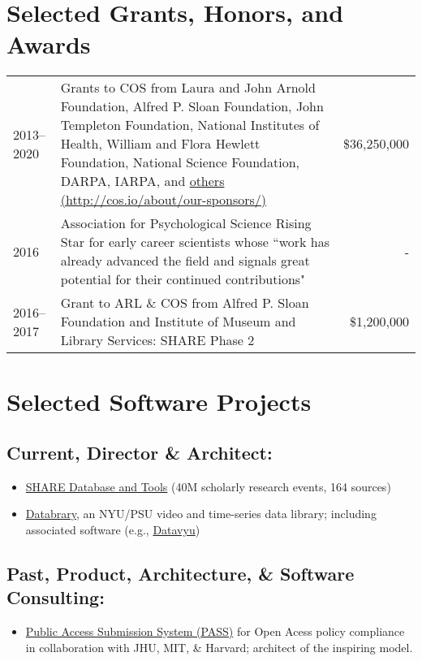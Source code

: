 \documentclass[11pt]{article}
\begin{document}

\section*{Selected Grants, Honors, and Awards}
\begin{tabularx}{\textwidth}{lXr}
2013--2020 	& Grants to COS from Laura and John Arnold Foundation, Alfred P. Sloan Foundation, John Templeton Foundation, National Institutes of Health, William and Flora Hewlett Foundation, National Science Foundation, DARPA, IARPA, and \href{http://cos.io/about/our-sponsors/}{others (http://cos.io/about/our-sponsors/)} & \$36,250,000 \\
2016			& Association for Psychological Science Rising Star for early career scientists whose ``work has already advanced the field and signals great potential for their continued contributions" & - \\
2016--2017		& Grant to ARL \& COS from Alfred P. Sloan Foundation and Institute of Museum and Library Services: SHARE Phase 2 & \$1,200,000 \\
\end{tabularx}

\begin{publications}
\end{publications}

\section*{Selected Software Projects}

\subsection{Current, Director \& Architect:}
\begin{itemize}
	\item \href{http://share.osf.io}{SHARE Database and Tools} (40M scholarly research events, 164 sources)
	\item \href{http://databrary.org}{Databrary}, an NYU/PSU video and time-series data library; including associated software (e.g., \href{http://datavyu.org}{Datavyu})
\end{itemize}

\subsection{Past, Product, Architecture, \& Software Consulting:}
\begin{itemize}
	\item \href{https://github.com/oa-pass}{Public Access Submission System (PASS)} for Open Acess policy compliance in collaboration with JHU, MIT, \& Harvard; architect of the inspiring model.
\end{itemize}
\end{document}
